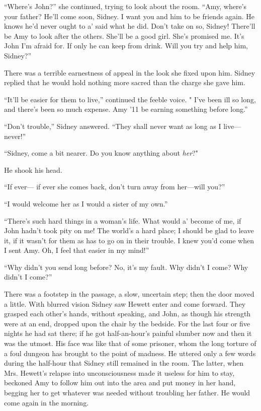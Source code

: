``Where's John?'' she continued, trying to look about the room. ``Amy,
where's your father? He'll come soon, Sidney. I want you and him to be
friends again. He knows he'd never ought to a' said what he did. Don't
take on so, Sidney! There'll be Amy to look after the others. She'll be
a good girl. She's promised me. It's John I'm afraid for. If only he can
keep from drink. Will you try and help him, Sidney?''

There was a terrible earnestness of appeal {}in the look she fixed upon
him. Sidney replied that he would hold nothing more sacred than the
charge she gave him.

``It'll be easier for them to live,'' continued the feeble voice. " I've
been ill so long, and there's been so much expense. Amy '11 be earning
something before long.''

``Don't trouble,'' Sidney answered. ``They shall never want as long as I
live---never!''

``Sidney, come a bit nearer. Do you know anything about \emph{her}?"

He shook his head.

``If ever--- if ever she comes back, don't turn away from her---will
you?''

``I would welcome her as I would a sister of my own.''

``There's such hard things in a woman's life. What would a' become of
me, if John hadn't took pity on me! The world's a hard place; I should
be glad to leave it, if it wasn't for them as has to go on in their
trouble. I knew you'd come when I sent Amy. Oh, I feel that easier in my
mind!''

``Why didn't you send long before? No, {}it's my fault. Why didn't I
come? Why didn't I come?''

There was a footstep in the passage, a slow, uncertain step; then the
door moved a little. With blurred vision Sidney saw Hewett enter and
come forward. They grasped each other's hands, without speaking, and
John, as though his strength were at an end, dropped upon the chair by
the bedside. For the last four or five nights he had sat there; if he
got half-an-hour's painful slumber now and then it was the utmost. His
face was like that of some prisoner, whom the long torture of a foul
dungeon has brought to the point of madness. He uttered only a few words
during the half-hour that Sidney still remained in the room. The latter,
when Mrs. Hewett's relapse into unconsciousness made it useless for him
to stay, beckoned Amy to follow him out into the area and put money in
her hand, begging her to get whatever was needed without troubling her
father. He would come again in the morning.

